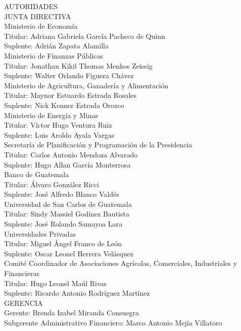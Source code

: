 {\Bold \LARGE AUTORIDADES}\\[1cm]
{\Bold \large \color{color1!89!black} JUNTA  DIRECTIVA} \\[0.4cm]
{\Bold Ministerio de Economía}\\ 
Titular: Adriana Gabriela García Pacheco de Quinn\\
Suplente: Adrián Zapata Alamilla\\[0.4cm]

{\Bold Ministerio de Finanzas Públicas}\\ 
Titular: Jonathan Kikil Thomas Menkos Zeissig\\
Suplente: Walter Orlando Figuera Chávez\\[0.4cm]

{\Bold Ministerio de Agricultura, Ganadería y Alimentación}\\ 
Titular: Maynor Estuardo Estrada Rosales\\
Suplente: Nick Kenner Estrada Orozco\\[0.4cm]

{\Bold Ministerio de Energía y Minas}\\ 
Titular: Víctor Hugo Ventura Ruiz\\
Suplente: Luis Aroldo Ayala Vargas\\[0.4cm]

{\Bold Secretaría de Planificación y Programación de la Presidencia}\\ 
Titular: Carlos Antonio Mendoza Alvarado\\
Suplente: Hugo Allan García Monterrosa\\[0.4cm]

{\Bold Banco de Guatemala}\\ 
Titular: Álvaro González Ricci\\
Suplente: José Alfredo Blanco Valdés\\[0.4cm]

{\Bold Universidad de San Carlos de Guatemala}\\ 
Titular: Sindy Massiel Godínez Bautista\\
Suplente: José Rolando Samayoa Lara\\[0.4cm]

{\Bold Universidades Privadas}\\ 
Titular: Miguel Ángel Franco de León\\
Suplente: Oscar Leonel Herrera Velásquez\\[0.4cm]

{\Bold Comité Coordinador de Asociaciones Agrícolas, Comerciales, Industriales y Financieras}\\ 
Titular: Hugo Leonel Maúl Rivas\\
Suplente: Ricardo Antonio Rodríguez Martínez\\[0.4cm]

{\Bold \large \color{color1!89!black} GERENCIA}\\[0.2cm]
Gerente: Brenda Izabel Miranda Consuegra\\
Subgerente Administrativo Financiero: Marco Antonio Mejía Villatoro\\ 
